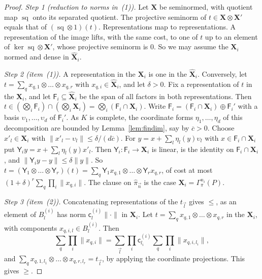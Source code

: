 \documentclass[11pt]{amsart}
\theoremstyle{definition}
\theoremstyle{remark}
\numberwithin{equation}{section}
\newcommand{\norm}[1]{\lVert #1\rVert}
\theoremstyle{plain}
\theoremstyle{definition}
\theoremstyle{plain}
\begin{document}
\begin{proof}
\emph{Step 1 (reduction to norms in~(1)).} Let $\mathbf X$ be seminormed, with quotient map $\operatorname{sq}$ onto its separated quotient. The projective seminorm of $t\in\mathbf X\otimes\mathbf X'$ equals that of $(\operatorname{sq}\otimes1)(t)$. Representations map to representations. A representation of the image lifts, with the same cost, to one of $t$ up to an element of $\ker\operatorname{sq}\otimes\mathbf X'$, whose projective seminorm is $0$. So we may assume the $\mathbf X_i$ normed and dense in $\widehat{\mathbf X}_i$.

\emph{Step 2 (item~(1)).} A representation in the $\mathbf X_i$ is one in the $\widehat{\mathbf X}_i$. Conversely, let $t=\sum_qx_{q,1}\otimes\dots\otimes x_{q,r}$ with $x_{q,i}\in\widehat{\mathbf X}_i$, and let $\delta>0$. Fix a representation of $t$ in the $\mathbf X_i$, and let $\mathsf F_i\subseteq\widehat{\mathbf X}_i$ be the span of all factors in both representations. Then $t\in(\bigotimes_i\mathsf F_i)\cap(\bigotimes_i\mathbf X_i)=\bigotimes_i(\mathsf F_i\cap\mathbf X_i)$. Write $\mathsf F_i=(\mathsf F_i\cap\mathbf X_i)\oplus\mathsf F_i'$ with a basis $\upsilon_1,\dots,\upsilon_d$ of $\mathsf F_i'$. As $K$ is complete, the coordinate forms $\eta_1,\dots,\eta_d$ of this decomposition are bounded by Lemma~\ref{lem:findim}, say by $\overline c>0$. Choose $x'_l\in\mathbf X_i$ with $\norm{x'_l-\upsilon_l}\le\delta/(d\overline c)$. For $y=x+\sum_l\eta_l(y)\upsilon_l$ with $x\in\mathsf F_i\cap\mathbf X_i$ put $\mathsf Y_iy=x+\sum_l\eta_l(y)x'_l$. Then $\mathsf Y_i\colon\mathsf F_i\to\mathbf X_i$ is linear, is the identity on $\mathsf F_i\cap\mathbf X_i$, and $\norm{\mathsf Y_iy-y}\le\delta\norm y$. So $t=(\mathsf Y_1\otimes\dots\otimes\mathsf Y_r)(t)=\sum_q\mathsf Y_1x_{q,1}\otimes\dots\otimes\mathsf Y_rx_{q,r}$, of cost at most $(1+\delta)^r\sum_q\prod_i\norm{x_{q,i}}$. The clause on $\widehat\pi_{\vec n}$ is the case $\mathbf X_i=\Gamma^{n_i}_\pi(P)$.

\emph{Step 3 (item~(2)).} Concatenating representations of the $t_{\vec l}$ gives $\le$, as an element of $B^{(i)}_l$ has norm $\mathsf c^{(i)}_l\norm\cdot$ in $\mathbf X_i$. Let $t=\sum_qx_{q,1}\otimes\dots\otimes x_{q,r}$ in the $\mathbf X_i$, with components $x_{q,i,l}\in B^{(i)}_l$. Then
\[
 \sum_q\prod_i\norm{x_{q,i}}=\sum_{\vec l}\prod_i\mathsf c^{(i)}_{l_i}\sum_q\prod_i\norm{x_{q,i,l_i}},
\]
and $\sum_qx_{q,1,l_1}\otimes\dots\otimes x_{q,r,l_r}=t_{\vec l}$, by applying the coordinate projections. This gives $\ge$.
\end{proof}
\end{document}
